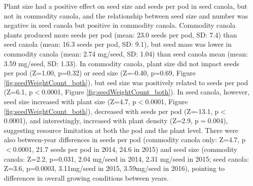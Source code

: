 \documentclass[12pt]{article} %
\begin{document}
Plant size had a positive effect on seed size and seeds per pod in seed canola, but not in commodity canola, and the relationship between seed size and number was negative in seed canola but positive in commodity canola.
Commodity canola plants produced more seeds per pod (mean: 23.0 seeds per pod, SD: 7.4) than seed canola (mean: 16.3 seeds per pod, SD: 9.1), but seed mass was lower in commodity canola (mean: 2.74 mg/seed, SD: 1.04) than seed canola mean (mean: 3.59 mg/seed, SD: 1.33).
In commodity canola, plant size did not impact seeds per pod (Z=1.00, p=0.32) or seed size (Z=-0.40, p=0.69, Figure \ref{fig:seedWeightCount_both}), but eed size was positively related to seeds per pod (Z=6.1, p$<$0.0001, Figure \ref{fig:seedWeightCount_both}).
In seed canola, however, seed size increased with plant size (Z=4.7, p$<$0.0001, Figure \ref{fig:seedWeightCount_both}), decreased with seeds per pod (Z=-13.1, p$<$0.0001), and interestingly, increased with plant density (Z=2.9, p$=$0.004), suggesting resource limitation at both the pod and the plant level. 
There were also between-year differences in seeds per pod (commodity canola only: Z=4.7, p$<$0.0001, 21.7 seeds per pod in 2014, 24.6 in 2015) and seed size (commodity canola: Z=2.2, p=0.031, 2.04 mg/seed in 2014, 2.31 mg/seed in 2015; seed canola: Z=3.6, p=0.0003, 3.11mg/seed in 2015, 3.59mg/seed in 2016), pointing to differences in overall growing conditions between years.
\end{document}
